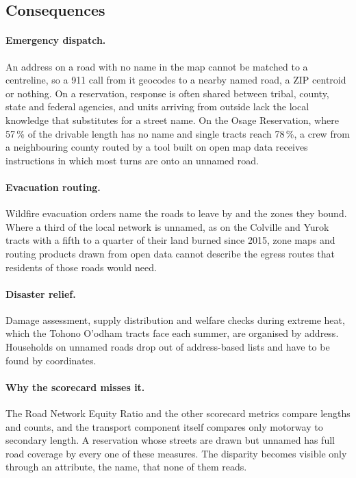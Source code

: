 \documentclass[11pt]{article}
\begin{document}
\subsection{Consequences}

\paragraph{Emergency dispatch.} An address on a road with no name in the map
cannot be matched to a centreline, so a 911 call from it geocodes to a
nearby named road, a ZIP centroid or nothing. On a reservation, response is
often shared between tribal, county, state and federal agencies, and units
arriving from outside lack the local knowledge that substitutes for a street
name. On the Osage Reservation, where 57\,\% of the drivable length has no
name and single tracts reach 78\,\%, a crew from a neighbouring county
routed by a tool built on open map data receives instructions in which most
turns are onto an unnamed road.

\paragraph{Evacuation routing.} Wildfire evacuation orders name the roads
to leave by and the zones they bound. Where a third of the local network is
unnamed, as on the Colville and Yurok tracts with a fifth to a quarter of
their land burned since 2015, zone maps and routing products drawn from open
data cannot describe the egress routes that residents of those roads would
need.

\paragraph{Disaster relief.} Damage assessment, supply distribution and
welfare checks during extreme heat, which the Tohono O'odham tracts face each
summer, are organised by address. Households on unnamed roads drop out of
address-based lists and have to be found by coordinates.

\paragraph{Why the scorecard misses it.} The Road Network Equity Ratio and
the other scorecard metrics compare lengths and counts, and the transport
component itself compares only motorway to secondary length. A reservation
whose streets are drawn but unnamed has full road coverage by every one of
these measures. The disparity becomes visible only through an attribute,
the name, that none of them reads.
\end{document}
